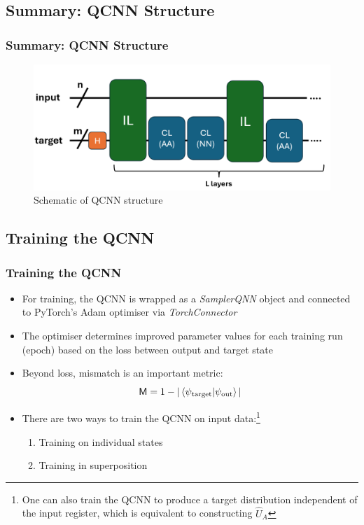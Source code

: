 \documentclass{beamer}
\begin{document}
\begin{frame}
\subsection{Summary: QCNN Structure}
\frametitle{Summary: QCNN Structure}
\begin{figure}[h]
\centering
\includegraphics[width=\linewidth]{im/QCNN_structure}
\caption{Schematic of QCNN structure}
\end{figure}
\end{frame}

\begin{frame}
\section{Training the QCNN}
\frametitle{Training the QCNN}
\begin{itemize}
\item For training, the QCNN is wrapped as a \emph{SamplerQNN} object and connected to PyTorch's \alert{Adam optimiser} via \emph{TorchConnector}
\item The optimiser determines improved parameter values for each training run (\alert{epoch}) based on the \alert{loss} between output and target state
\item Beyond loss, \alert{mismatch} is an important metric:
\begin{equation}
\mathsf{M}= 1 - |\braket{\psi_\text{target}| \psi_\text{out}}|
\end{equation}
\item There are two ways to train the QCNN on input data:\footnote{One can also train the QCNN to produce a target distribution independent of the input register, which is equivalent to constructing $\hat{U}_A$}
\begin{enumerate}
\item Training on \alert{individual states}
\item Training in \alert{superposition}
\end{enumerate}
\end{itemize}
\end{frame}
\end{document}
